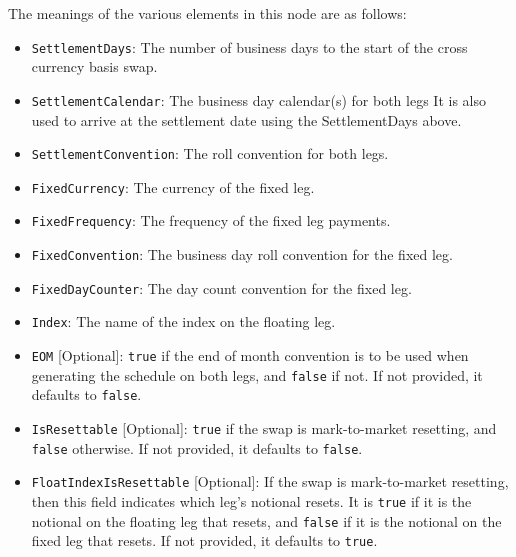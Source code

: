 The meanings of the various elements in this node are as follows:
\begin{itemize}
\item \lstinline!SettlementDays!: The number of business days to the start of the cross currency basis swap.
\item \lstinline!SettlementCalendar!: The business day calendar(s) for both legs
    It is also used to arrive at the settlement date using the SettlementDays above.
\item \lstinline!SettlementConvention!: The roll convention for both legs.
\item \lstinline!FixedCurrency!: The currency of the fixed leg.
\item \lstinline!FixedFrequency!: The frequency of the fixed leg payments.
\item \lstinline!FixedConvention!: The business day roll convention for the fixed leg.
\item \lstinline!FixedDayCounter!: The day count convention for the fixed leg.
\item \lstinline!Index!: The name of the index on the floating leg.
\item \lstinline!EOM! [Optional]:
    \lstinline!true! if the end of month convention is to be used when generating the schedule on both legs, 
    and \lstinline!false! if not. If not provided, it defaults to \lstinline!false!.
\item \lstinline!IsResettable! [Optional]: \lstinline!true! if the swap is mark-to-market resetting, 
    and \lstinline!false! otherwise. If not provided, it defaults to \lstinline!false!.
\item \lstinline!FloatIndexIsResettable! [Optional]: If the swap is mark-to-market resetting, 
    then this field indicates which leg's notional resets.
    It is \lstinline!true! if it is the notional on the floating leg that resets, 
    and \lstinline!false! if it is the notional on the fixed leg that resets.
    If not provided, it defaults to \lstinline!true!.
\end{itemize}

